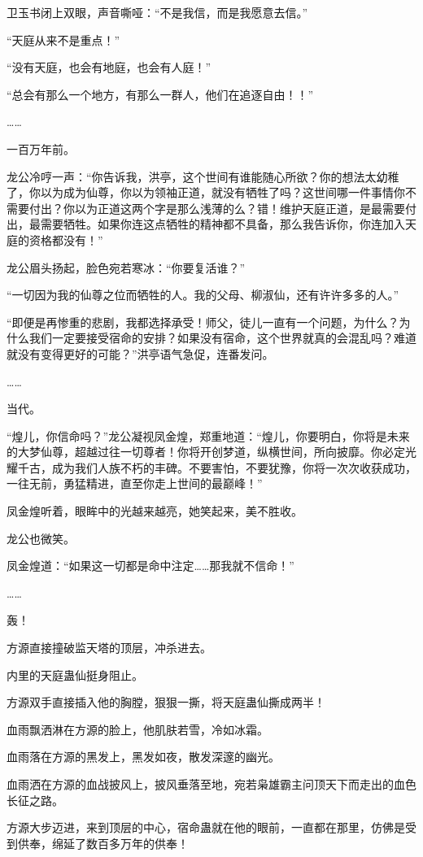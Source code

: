 \begin{this_body}
卫玉书闭上双眼，声音嘶哑：“不是我信，而是我愿意去信。”

“天庭从来不是重点！”

“没有天庭，也会有地庭，也会有人庭！”

“总会有那么一个地方，有那么一群人，他们在追逐自由！！”

……

一百万年前。

龙公冷哼一声：“你告诉我，洪亭，这个世间有谁能随心所欲？你的想法太幼稚了，你以为成为仙尊，你以为领袖正道，就没有牺牲了吗？这世间哪一件事情你不需要付出？你以为正道这两个字是那么浅薄的么？错！维护天庭正道，是最需要付出，最需要牺牲。如果你连这点牺牲的精神都不具备，那么我告诉你，你连加入天庭的资格都没有！”

龙公眉头扬起，脸色宛若寒冰：“你要复活谁？”

“一切因为我的仙尊之位而牺牲的人。我的父母、柳淑仙，还有许许多多的人。”

“即便是再惨重的悲剧，我都选择承受！师父，徒儿一直有一个问题，为什么？为什么我们一定要接受宿命的安排？如果没有宿命，这个世界就真的会混乱吗？难道就没有变得更好的可能？”洪亭语气急促，连番发问。

……

当代。

“煌儿，你信命吗？”龙公凝视凤金煌，郑重地道：“煌儿，你要明白，你将是未来的大梦仙尊，超越过往一切尊者！你将开创梦道，纵横世间，所向披靡。你必定光耀千古，成为我们人族不朽的丰碑。不要害怕，不要犹豫，你将一次次收获成功，一往无前，勇猛精进，直至你走上世间的最巅峰！”

凤金煌听着，眼眸中的光越来越亮，她笑起来，美不胜收。

龙公也微笑。

凤金煌道：“如果这一切都是命中注定……那我就不信命！”

……

轰！

方源直接撞破监天塔的顶层，冲杀进去。

内里的天庭蛊仙挺身阻止。

方源双手直接插入他的胸膛，狠狠一撕，将天庭蛊仙撕成两半！

血雨飘洒淋在方源的脸上，他肌肤若雪，冷如冰霜。

血雨落在方源的黑发上，黑发如夜，散发深邃的幽光。

血雨洒在方源的血战披风上，披风垂落至地，宛若枭雄霸主问顶天下而走出的血色长征之路。

方源大步迈进，来到顶层的中心，宿命蛊就在他的眼前，一直都在那里，仿佛是受到供奉，绵延了数百多万年的供奉！


\end{this_body}

